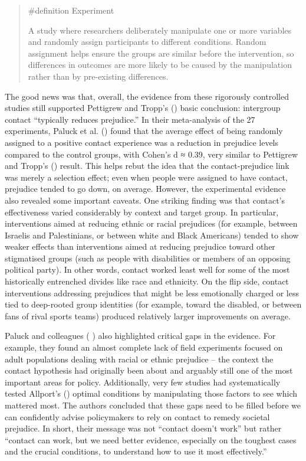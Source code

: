 \documentclass[
  letterpaper,
]{book}
\begin{document}
\begin{quote}
\label{def-experiment}{\#definition} Experiment

A study where researchers deliberately manipulate one or more variables
and randomly assign participants to different conditions. Random
assignment helps ensure the groups are similar before the intervention,
so differences in outcomes are more likely to be caused by the
manipulation rather than by pre-existing differences.
\end{quote}

The good news was that, overall, the evidence from these rigorously
controlled studies still supported Pettigrew and Tropp's
() basic conclusion: intergroup
contact ``typically reduces prejudice.'' In their meta-analysis of the
27 experiments, Paluck et al. ()
found that the average effect of being randomly assigned to a positive
contact experience was a reduction in prejudice levels compared to the
control groups, with Cohen's d ≈ 0.39, very similar to Pettigrew and
Tropp's () result. This helps
rebut the idea that the contact-prejudice link was merely a selection
effect; even when people were assigned to have contact, prejudice tended
to go down, on average. However, the experimental evidence also revealed
some important caveats. One striking finding was that contact's
effectiveness varied considerably by context and target group. In
particular, interventions aimed at reducing ethnic or racial prejudices
(for example, between Israelis and Palestinians, or between white and
Black Americans) tended to show weaker effects than interventions aimed
at reducing prejudice toward other stigmatised groups (such as people
with disabilities or members of an opposing political party). In other
words, contact worked least well for some of the most historically
entrenched divides like race and ethnicity. On the flip side, contact
interventions addressing prejudices that might be less emotionally
charged or less tied to deep-rooted group identities (for example,
toward the disabled, or between fans of rival sports teams) produced
relatively larger improvements on average.

Paluck and colleagues ( ) also
highlighted critical gaps in the evidence. For example, they found an
almost complete lack of field experiments focused on adult populations
dealing with racial or ethnic prejudice -- the context the contact
hypothesis had originally been about and arguably still one of the most
important areas for policy. Additionally, very few studies had
systematically tested Allport's ()
optimal conditions by manipulating those factors to see which mattered
most. The authors concluded that these gaps need to be filled before we
can confidently advise policymakers to rely on contact to remedy
societal prejudice. In short, their message was not ``contact doesn't
work'' but rather ``contact can work, but we need better evidence,
especially on the toughest cases and the crucial conditions, to
understand how to use it most effectively.''
\end{document}
